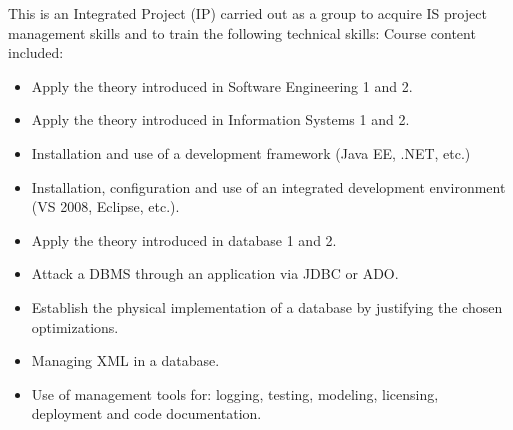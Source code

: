 This is an Integrated Project (IP) carried out as a group to acquire IS project management skills and to train the following technical skills:
Course content included:
\begin{itemize}
    \item Apply the theory introduced in Software Engineering 1 and 2.
    \item Apply the theory introduced in Information Systems 1 and 2.
    \item Installation and use of a development framework (Java EE, .NET, etc.)
    \item Installation, configuration and use of an integrated development environment (VS 2008, Eclipse, etc.).
    \item Apply the theory introduced in database 1 and 2.
    \item Attack a DBMS through an application via JDBC or ADO.
    \item Establish the physical implementation of a database by justifying the chosen optimizations.
    \item Managing XML in a database.
    \item Use of management tools for: logging, testing, modeling, licensing, deployment and code documentation.
\end{itemize}
